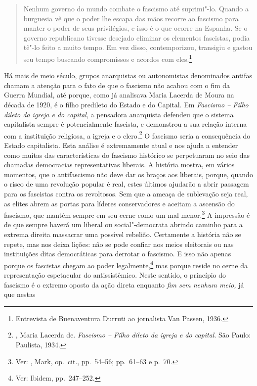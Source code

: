 \begin{quote}
Nenhum governo do mundo combate o fascismo até suprimi"-lo. Quando a
burguesia vê que o poder lhe escapa das mãos recorre ao fascismo para
manter o poder de seus privilégios, e isso é o que ocorre na Espanha. Se
o governo republicano tivesse desejado eliminar os elementos fascistas,
podia tê"-lo feito a muito tempo. Em vez disso, contemporizou,
transigiu e gastou seu tempo buscando compromissos e acordos com
eles.\footnote{Entrevista de Buenaventura Durruti ao jornalista Van
  Passen, 1936.}
\end{quote}

Há mais de meio século, grupos anarquistas ou autonomistas denominados
antifas chamam a atenção para o fato de que o fascismo não acabou
com o fim da  Guerra Mundial, até porque, como já analisava Maria Lacerda
de Moura na década de 1920, é o filho predileto do Estado e do Capital. Em
\emph{Fascismo -- Filho dileto da igreja e do capital}, a pensadora
anarquista defendeu que o sistema capitalista sempre é potencialmente
fascista, e demonstrou a sua relação interna com a
instituição religiosa, a igreja e o clero.\footnote{, Maria Lacerda de.
  \emph{Fascismo -- Filho dileto da igreja e do capital}. São Paulo:
  Paulista, 1934.} O fascismo seria a consequência do Estado
capitalista. Esta análise é extremamente atual e nos ajuda a entender
como muitas das características do fascismo histórico se perpetuaram no
seio das chamadas democracias representativas liberais. A história
mostra, em vários momentos, que o antifascismo não deve dar os braços
aos liberais, porque, quando o risco de uma revolução popular é real,
estes últimos ajudarão a abrir passagem para os fascistas contra os
revoltosos. Sem que a ameaça de sublevação seja real, as elites abrem as
portas para líderes conservadores e aceitam a ascensão do fascismo, que
mantêm sempre em seu cerne como um mal menor.\footnote{Ver: , Mark, op.~cit., pp.~54--56; pp.~61--63 e p.~70.} A impressão é de que sempre haverá um liberal
ou social"-democrata abrindo caminho para a extrema direita
massacrar uma possível rebelião. Certamente a história não se repete,
mas nos deixa lições: não se pode confiar nos meios eleitorais ou nas instituições ditas democráticas para derrotar o fascismo. E
isso não apenas porque os fascistas chegam ao poder legalmente,\footnote{Ver: Ibidem, pp.~247--252.} mas porque reside no cerne da representação espetacular do %
antissistêmico. Neste sentido, o princípio do fascismo é o extremo
oposto da ação direta enquanto \emph{fim sem nenhum meio,} já que nestas
